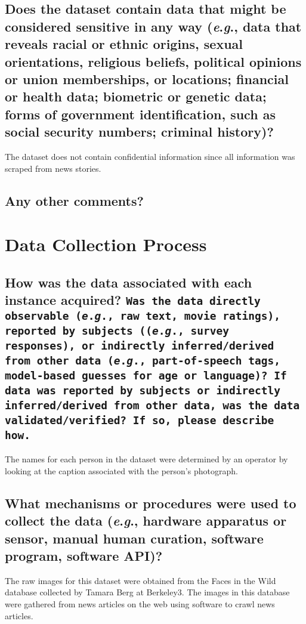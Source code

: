 \documentclass[a4paper,9pt]{extarticle}
\newcommand{\eg}{\textit{e}.\textit{g}., }
\begin{document}
\begin{multicols}{2}
\subsection*{Does the dataset contain data that might be considered sensitive in any way (\eg data that reveals racial or ethnic origins, sexual orientations, religious beliefs, political opinions or union memberships, or locations; financial or health data; biometric or genetic data; forms of government identification, such as social security numbers; criminal history)?}
\noindent The dataset does not contain confidential information since all information was scraped from news stories. 

\subsection*{Any other comments?}


\section*{Data Collection Process}

\subsection*{How was the data associated with each instance acquired? \texttt{Was the data directly observable (\eg raw text, movie ratings), reported by subjects ((\eg survey responses), or indirectly inferred/derived from other data (\eg part-of-speech tags, model-based guesses for age or language)? If data was reported by subjects or indirectly inferred/derived from other data, was the data validated/verified? If so, please describe how.}}

\noindent The names for each person in the dataset were determined by an
operator by looking at the caption associated with the person’s
photograph.

\subsection*{What mechanisms or procedures were used to collect the data (\eg hardware apparatus or sensor, manual human curation, software program, software API)?}
\noindent The raw images for this dataset were obtained from the Faces in
the Wild database collected by Tamara Berg at Berkeley3. The images in this database were gathered from news articles on the web using software to crawl news articles.



\end{multicols}
\end{document}
